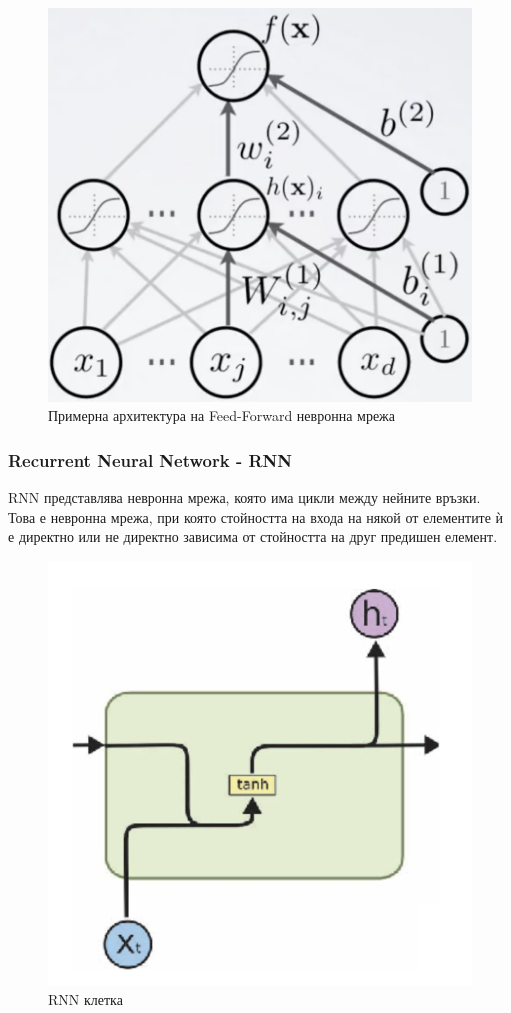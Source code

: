 \documentclass{article}
\begin{document}
\begin{figure}[H]
  \centering
  \captionsetup{justification=centering}
  \includegraphics[width=450px, keepaspectratio]{chapter-03/feed-forward.png}
  \caption{Примерна архитектура на Feed-Forward невронна мрежа}
\end{figure}

\subsubsection{Recurrent Neural Network - RNN}

RNN представлява невронна мрежа, която има цикли между нейните връзки. Това е невронна мрежа, при която стойността на
входа на някой от елементите ѝ е директно или не директно зависима от стойността на друг предишен елемент.
\cite{intro-to-nlp-stanford}

\begin{figure}[H]
  \centering
  \captionsetup{justification=centering}
  \includegraphics[width=450px, keepaspectratio]{chapter-03/rnn.png}
  \caption{RNN клетка}
\end{figure}
\end{document}
